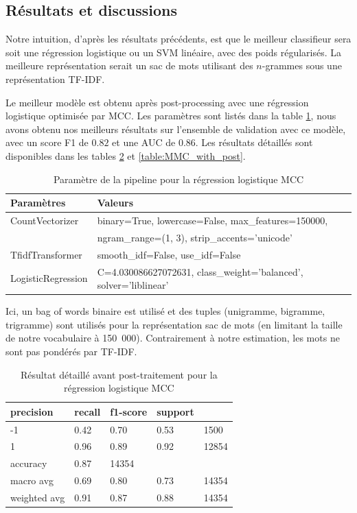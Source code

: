 \documentclass{article}
\begin{document}
\subsection{Résultats et discussions}
Notre intuition, d'après les résultats précédents, est que le meilleur classifieur sera soit une régression logistique ou un SVM linéaire, avec des poids régularisés. La meilleure représentation serait un sac de mots utilisant des $n$-grammes sous une représentation TF-IDF.

Le meilleur modèle est obtenu après post-processing avec une régression logistique optimisée par MCC. Les paramètres sont listés dans la table \ref{table:MCC_pipeline}, nous avons obtenu nos meilleurs résultats sur l'ensemble de validation avec ce modèle, avec un score F1 de $0.82$ et une AUC de $0.86$. Les résultats détaillés sont disponibles dans les tables \ref{table:MMC_no_post} et \ref{table:MMC_with_post}. 

\begin{table}[H]
    \centering
    \begin{tabular}{ll}
        Paramètres & Valeurs \\ \hline
        CountVectorizer & binary=True, lowercase=False, max\_features=150000,  \\ 
        ~ & ngram\_range=(1, 3), strip\_accents='unicode' \\ 
        TfidfTransformer & smooth\_idf=False, use\_idf=False \\ 
        LogisticRegression & C=4.030086627072631, class\_weight='balanced', solver='liblinear' \\ 
    \end{tabular}
    \caption{Paramètre de la pipeline pour la régression logistique MCC}
    \label{table:MCC_pipeline}
\end{table}

Ici, un bag of words binaire est utilisé et des tuples (unigramme, bigramme, trigramme) sont utilisés pour la représentation sac de mots (en limitant la taille de notre vocabulaire à 150~000). Contrairement à notre estimation, les mots ne sont pas pondérés par TF-IDF.

\begin{table}[H]
    \centering
    \begin{tabular}{lllll}
        precision & recall & f1-score & support & ~ \\ \hline
        -1 & 0.42 & 0.70 & 0.53 & 1500 \\ 
        1 & 0.96 & 0.89 & 0.92 & 12854 \\ 
        accuracy & 0.87 & 14354 & ~ & ~ \\ 
        macro avg & 0.69 & 0.80 & 0.73 & 14354 \\ 
        weighted avg & 0.91 & 0.87 & 0.88 & 14354 \\ 
    \end{tabular}
    \caption{Résultat détaillé avant post-traitement pour la régression logistique MCC}
    \label{table:MMC_no_post}
\end{table}
\end{document}
